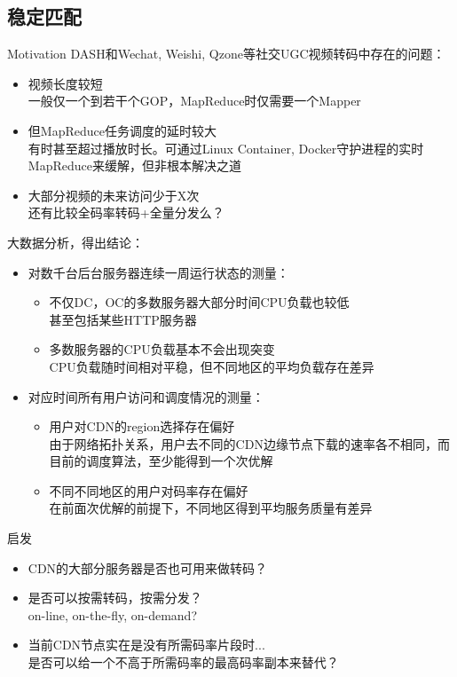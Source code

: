 \documentclass{beamer}
\begin{document}
\subsection{稳定匹配}
\begin{frame}{Motivation}
DASH和Wechat, Weishi, Qzone等社交UGC视频转码中存在的问题：
\begin{itemize}
\item 视频长度较短\\
一般仅一个到若干个GOP，MapReduce时仅需要一个Mapper
\item 但MapReduce任务调度的延时较大\\
有时甚至超过播放时长。可通过Linux Container, Docker守护进程的实时MapReduce来缓解，但非根本解决之道
\item 大部分视频的未来访问少于X次\\
还有比较全码率转码+全量分发么？
\end{itemize}
\end{frame}
\begin{frame}{大数据分析，得出结论：}
\begin{itemize}
	\item 对数千台后台服务器连续一周运行状态的测量：\\
		\begin{itemize}
		\item 不仅DC，OC的多数服务器大部分时间CPU负载也较低\\
		甚至包括某些HTTP服务器
		\item 多数服务器的CPU负载基本不会出现突变\\
		CPU负载随时间相对平稳，但不同地区的平均负载存在差异
		\end{itemize}
	\item 对应时间所有用户访问和调度情况的测量：\\
		\begin{itemize}
		\item 用户对CDN的region选择存在偏好\\
		由于网络拓扑关系，用户去不同的CDN边缘节点下载的速率各不相同，而目前的调度算法，至少能得到一个次优解
		\item 不同不同地区的用户对码率存在偏好\\
		在前面次优解的前提下，不同地区得到平均服务质量有差异
	\end{itemize}
\end{itemize}
\end{frame}
\begin{frame}{启发}
\begin{itemize}
\item CDN的大部分服务器是否也可用来做转码？\\
\item 是否可以按需转码，按需分发？\\
on-line, on-the-fly, on-demand?
\item 当前CDN节点实在是没有所需码率片段时...\\
是否可以给一个不高于所需码率的最高码率副本来替代？
\end{itemize}
\end{frame}
\end{document}
